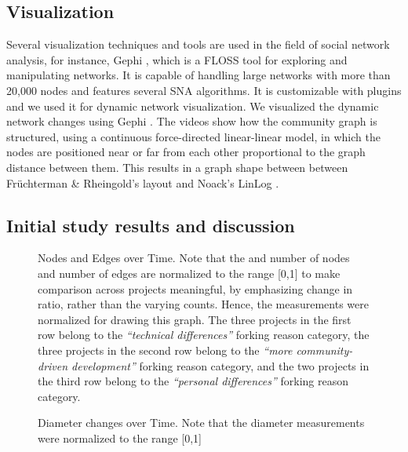 \documentclass{acm_proc_article-sp}
\begin{document}
\subsection{Visualization}
Several visualization techniques and tools are used in the field of social network analysis, for instance, Gephi \cite{Bastian}, which is a FLOSS tool for exploring and manipulating networks. It is capable of handling large networks with more than 20,000 nodes and features several SNA algorithms. It is customizable with plugins and we used it for dynamic network visualization.
We visualized the dynamic network changes using Gephi \cite{Bastian}. The videos show how the community graph is structured, using a continuous force-directed linear-linear model, in which the nodes are positioned near or far from each other proportional to the graph distance between them. This results in a graph shape between between Fr\"{u}chterman \& Rheingold's \cite{Fruchterman} layout and Noack's LinLog \cite{Noack}.
\subsection{Initial study results and discussion}
\label{results}

\begin{figure}[!Ht]
\centering
{}
\caption{Nodes and Edges over Time. Note that the and number of nodes and number of edges are normalized to the range [0,1] to make comparison across projects meaningful, by emphasizing change in ratio, rather than the varying counts. Hence, the measurements were normalized for drawing this graph. The three projects in the first row belong to the \textit{``technical differences''} forking reason category, the three projects in the second row belong to the \textit{``more community-driven development''} forking reason category, and the two projects in the third row belong to the \textit{``personal differences''} forking reason category.}
\label{figureNodesEdgesTimeR}
\end{figure}

\begin{figure}[!Ht]
\centering
{}
\caption{Diameter changes over Time. Note that the diameter measurements were normalized to the range [0,1]}
\label{figureDiameterTimeR}
\end{figure}
\end{document}
